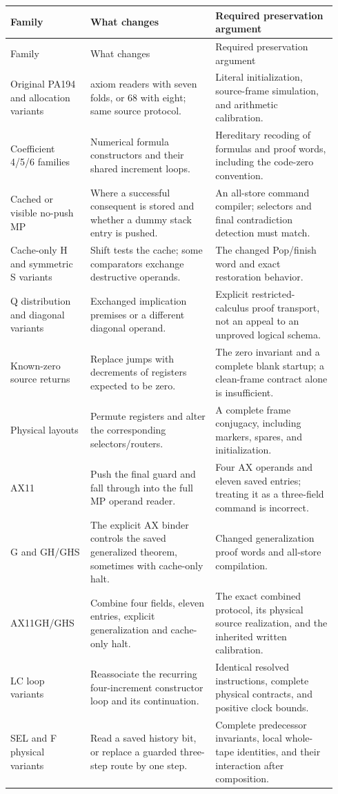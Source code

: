 \documentclass[11pt,letterpaper]{article}
\begin{document}
\begin{longtable}{@{}>{\raggedright\arraybackslash}p{0.23\linewidth}>{\raggedright\arraybackslash}p{0.36\linewidth}>{\raggedright\arraybackslash}p{0.35\linewidth}@{}}
\toprule
Family & What changes & Required preservation argument\\
\midrule\endfirsthead
\toprule Family & What changes & Required preservation argument\\\midrule\endhead
Original PA194 and allocation variants & 67 axiom readers with seven folds, or 68 with eight; same source protocol. & Literal initialization, source-frame simulation, and arithmetic calibration.\\[4pt]
Coefficient 4/5/6 families & Numerical formula constructors and their shared increment loops. & Hereditary recoding of formulas and proof words, including the code-zero convention.\\[4pt]
Cached or visible no-push MP & Where a successful consequent is stored and whether a dummy stack entry is pushed. & An all-store command compiler; selectors and final contradiction detection must match.\\[4pt]
Cache-only H and symmetric S variants & Shift tests the cache; some comparators exchange destructive operands. & The changed Pop/finish word and exact restoration behavior.\\[4pt]
Q distribution and diagonal variants & Exchanged implication premises or a different diagonal operand. & Explicit restricted-calculus proof transport, not an appeal to an unproved logical schema.\\[4pt]
Known-zero source returns & Replace jumps with decrements of registers expected to be zero. & The zero invariant and a complete blank startup; a clean-frame contract alone is insufficient.\\[4pt]
Physical layouts & Permute registers and alter the corresponding selectors/routers. & A complete frame conjugacy, including markers, spares, and initialization.\\[4pt]
AX11 & Push the final guard and fall through into the full MP operand reader. & Four AX operands and eleven saved entries; treating it as a three-field command is incorrect.\\[4pt]
G and GH/GHS & The explicit AX binder controls the saved generalized theorem, sometimes with cache-only halt. & Changed generalization proof words and all-store compilation.\\[4pt]
AX11GH/GHS & Combine four fields, eleven entries, explicit generalization and cache-only halt. & The exact combined protocol, its physical source realization, and the inherited written calibration.\\[4pt]
LC loop variants & Reassociate the recurring four-increment constructor loop and its continuation. & Identical resolved instructions, complete physical contracts, and positive clock bounds.\\[4pt]
SEL and F physical variants & Read a saved history bit, or replace a guarded three-step route by one step. & Complete predecessor invariants, local whole-tape identities, and their interaction after composition.\\
\bottomrule
\end{longtable}
\end{document}

